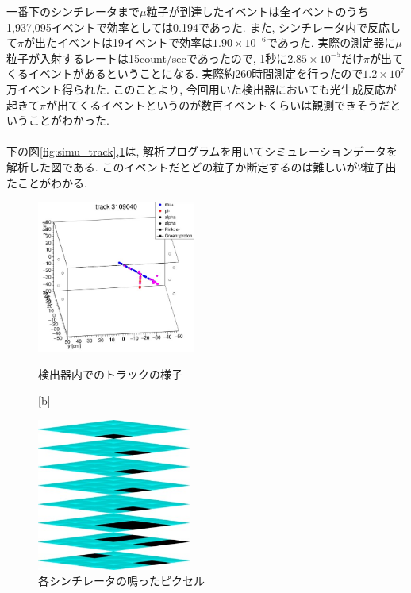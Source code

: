 一番下のシンチレータまで$\mu$粒子が到達したイベントは全イベントのうち1,937,095イベントで効率としては0.194であった.
また, シンチレータ内で反応して$\pi$が出たイベントは19イベントで効率は$1.90 \times10^{-6}$であった.
実際の測定器に$\mu$粒子が入射するレートは15count/secであったので, 1秒に$2.85 \times10^{-5}$だけ$\pi$が出てくるイベントがあるということになる.
実際約260時間測定を行ったので$1.2 \times10^{7}$万イベント得られた.
このことより, 今回用いた検出器においても光生成反応が起きて$\pi$が出てくるイベントというのが数百イベントくらいは観測できそうだということがわかった.
\\
\\
下の図\ref{fig:simu_track},\ref{fig:simu_pixel}は, 解析プログラムを用いてシミュレーションデータを解析した図である.
このイベントだとどの粒子か断定するのは難しいが2粒子出たことがわかる.
\begin{figure}[H]
    \begin{minipage}[b]{0.47\linewidth}
        \centering
        \includegraphics[height=5cm]{img/track_pion.jpg}
        \caption{検出器内でのトラックの様子}
        \label{fig:simu_track}
    \end{minipage}[b]
    \begin{minipage}[b]{0.47\linewidth}
        \centering
        \includegraphics[height=5cm]{img/track_simulation.jpg}
        \caption{各シンチレータの鳴ったピクセル}
        \label{fig:simu_pixel}
    \end{minipage}
\end{figure}
        
